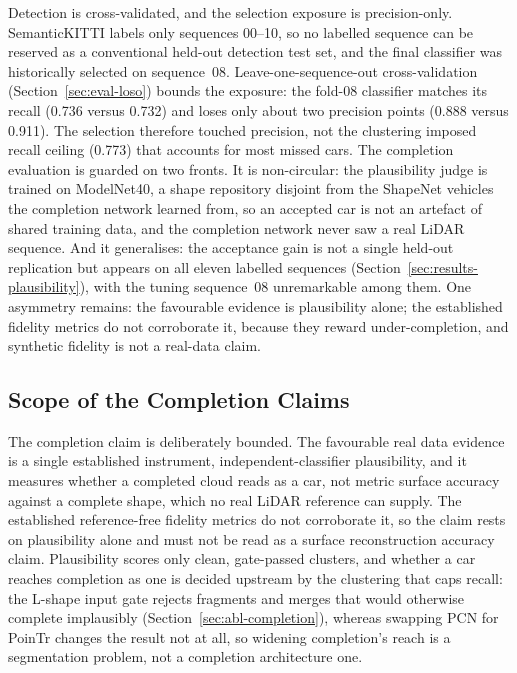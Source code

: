 Detection is cross-validated, and the selection exposure is precision-only. SemanticKITTI
labels only sequences 00--10, so no labelled sequence can be reserved as a
conventional held-out detection test set, and the final classifier was historically selected
on sequence~08. Leave-one-sequence-out cross-validation (Section~\ref{sec:eval-loso}) bounds
the exposure: the fold-08 classifier matches its recall (\num{0.736} versus \num{0.732}) and
loses only about two precision points (\num{0.888} versus \num{0.911}). The selection
therefore touched precision, not the clustering imposed recall ceiling (\num{0.773}) that accounts for
most missed cars. The completion evaluation is guarded on two fronts. It is
non-circular: the plausibility judge is trained on ModelNet40, a shape repository
disjoint from the ShapeNet vehicles the completion network learned from, so an accepted car is not
an artefact of shared training data, and the completion network never saw a real LiDAR
sequence. And it generalises: the acceptance gain is not a single held-out replication
but appears on all eleven labelled sequences (Section~\ref{sec:results-plausibility}), with
the tuning sequence~08 unremarkable among them. One asymmetry remains: the favourable
evidence is plausibility alone; the established fidelity metrics do not corroborate it,
because they reward under-completion, and synthetic fidelity is not a real-data claim.

\subsection{Scope of the Completion Claims}
\label{sec:disc-completion-scope}

The completion claim is deliberately bounded. The favourable real data evidence is a single
established instrument, independent-classifier plausibility, and it measures whether a
completed cloud reads as a car, not metric surface accuracy against a complete shape, which
no real LiDAR reference can supply. The established reference-free fidelity metrics do not
corroborate it, so the claim rests on plausibility alone and must not be read as a
surface reconstruction accuracy claim. Plausibility scores only clean, gate-passed clusters,
and whether a car reaches completion as one is decided upstream by the clustering that caps
recall: the L-shape input gate rejects fragments and merges that would otherwise complete
implausibly (Section~\ref{sec:abl-completion}), whereas swapping PCN for PoinTr changes the
result not at all, so widening completion's reach is a segmentation problem, not a
completion architecture one.

